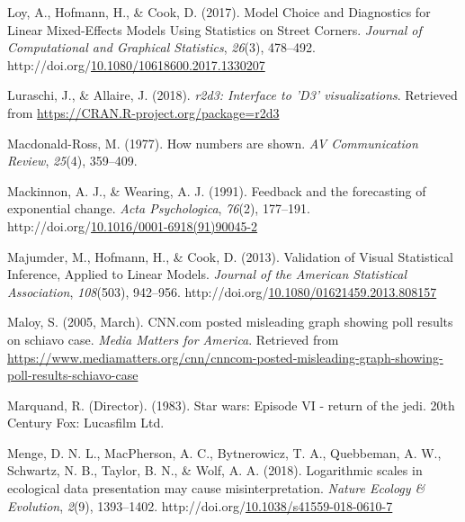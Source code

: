 \documentclass[print]{nuthesis}
\newlength{\cslhangindent}
\newenvironment{CSLReferences}[2]%
{\setlength{\parindent}{0pt}%
\everypar{\setlength{\hangindent}{\cslhangindent}}\ignorespaces}%
{\par}
\begin{document}
\begin{CSLReferences}{1}{0}
\leavevmode{}%
Loy, A., Hofmann, H., \& Cook, D. (2017). Model {Choice} and {Diagnostics} for {Linear} {Mixed}-{Effects} {Models} {Using} {Statistics} on {Street} {Corners}. \emph{Journal of Computational and Graphical Statistics}, \emph{26}(3), 478--492. http://doi.org/\href{https://doi.org/10.1080/10618600.2017.1330207}{10.1080/10618600.2017.1330207}

\leavevmode{}%
Luraschi, J., \& Allaire, J. (2018). \emph{r2d3: Interface to 'D3' visualizations}. Retrieved from \url{https://CRAN.R-project.org/package=r2d3}

\leavevmode{}%
Macdonald-Ross, M. (1977). How numbers are shown. \emph{AV Communication Review}, \emph{25}(4), 359--409.

\leavevmode{}%
Mackinnon, A. J., \& Wearing, A. J. (1991). Feedback and the forecasting of exponential change. \emph{Acta Psychologica}, \emph{76}(2), 177--191. http://doi.org/\href{https://doi.org/10.1016/0001-6918(91)90045-2}{10.1016/0001-6918(91)90045-2}

\leavevmode{}%
Majumder, M., Hofmann, H., \& Cook, D. (2013). Validation of {Visual} {Statistical} {Inference}, {Applied} to {Linear} {Models}. \emph{Journal of the American Statistical Association}, \emph{108}(503), 942--956. http://doi.org/\href{https://doi.org/10.1080/01621459.2013.808157}{10.1080/01621459.2013.808157}

\leavevmode{}%
Maloy, S. (2005, March). CNN.com posted misleading graph showing poll results on schiavo case. \emph{Media Matters for America}. Retrieved from \url{https://www.mediamatters.org/cnn/cnncom-posted-misleading-graph-showing-poll-results-schiavo-case}

\leavevmode{}%
Marquand, R. (Director). (1983). Star wars: Episode VI - return of the jedi. 20th Century Fox: Lucasfilm Ltd.

\leavevmode{}%
Menge, D. N. L., MacPherson, A. C., Bytnerowicz, T. A., Quebbeman, A. W., Schwartz, N. B., Taylor, B. N., \& Wolf, A. A. (2018). Logarithmic scales in ecological data presentation may cause misinterpretation. \emph{Nature Ecology \& Evolution}, \emph{2}(9), 1393--1402. http://doi.org/\href{https://doi.org/10.1038/s41559-018-0610-7}{10.1038/s41559-018-0610-7}


\end{CSLReferences}
\end{document}
